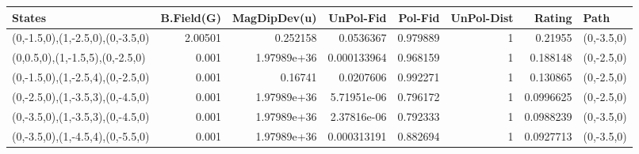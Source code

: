 \begin{tabular}{lrrrrrrl}
\hline
 States                           &   B.Field(G) &   MagDipDev(u) &   UnPol-Fid &   Pol-Fid &   UnPol-Dist &    Rating & Path       \\
\hline
 (0,-1.5,0),(1,-2.5,0),(0,-3.5,0) &      2.00501 &    0.252158    & 0.0536367   &  0.979889 &            1 & 0.21955   & (0,-3.5,0) \\
 (0,0.5,0),(1,-1.5,5),(0,-2.5,0)  &      0.001   &    1.97989e+36 & 0.000133964 &  0.968159 &            1 & 0.188148  & (0,-2.5,0) \\
 (0,-1.5,0),(1,-2.5,4),(0,-2.5,0) &      0.001   &    0.16741     & 0.0207606   &  0.992271 &            1 & 0.130865  & (0,-2.5,0) \\
 (0,-2.5,0),(1,-3.5,3),(0,-4.5,0) &      0.001   &    1.97989e+36 & 5.71951e-06 &  0.796172 &            1 & 0.0996625 & (0,-2.5,0) \\
 (0,-3.5,0),(1,-3.5,3),(0,-4.5,0) &      0.001   &    1.97989e+36 & 2.37816e-06 &  0.792333 &            1 & 0.0988239 & (0,-3.5,0) \\
 (0,-3.5,0),(1,-4.5,4),(0,-5.5,0) &      0.001   &    1.97989e+36 & 0.000313191 &  0.882694 &            1 & 0.0927713 & (0,-3.5,0) \\
\hline
\end{tabular}